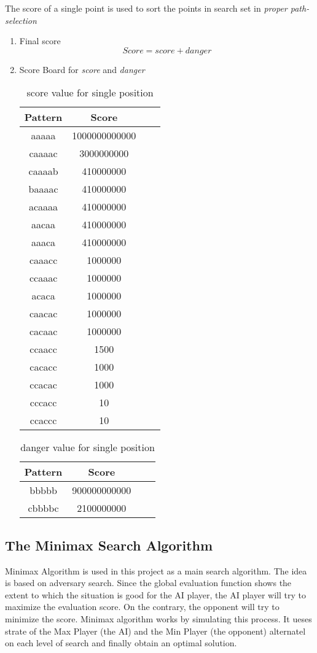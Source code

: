 \documentclass[conference]{IEEEtran}
\begin{document}
The score of a single point is used to sort the points in search set in \emph{proper path-selection}
\begin{enumerate}
	\item Final score
	$$Score = score + danger$$
	\item Score Board for \emph{score} and \emph{danger}
	
	\begin{table}[htb]
	\caption{score value for single position}
	\centering
    \begin{tabular}{cccc}
    \toprule
    Pattern&Score\\
    \midrule
	aaaaa&1000000000000\\
	caaaac&3000000000\\
	caaaab&410000000\\
    baaaac&410000000\\
    acaaaa&410000000\\
    aacaa&410000000\\
    aaaca&410000000\\
    caaacc&1000000\\
    ccaaac&1000000\\
    acaca&1000000\\
    caacac&1000000\\
    cacaac&1000000\\
    ccaacc&1500\\
    cacacc&1000\\
    ccacac&1000\\
    cccacc&10\\
    ccaccc&10\\    
	\bottomrule
	\end{tabular}
	\label{table:1}
	\end{table}
	

	\begin{table}[htb]
	\caption{danger value for single position}
	\centering
    \begin{tabular}{cccc}
    \toprule
    Pattern&Score\\
    \midrule
	bbbbb&900000000000\\
	cbbbbc&2100000000\\
	\bottomrule
	\end{tabular}
	\label{table:1}
	\end{table}
	
\end{enumerate}

\subsection{The Minimax Search Algorithm}
Minimax Algorithm is used in this project as a main search algorithm. The idea is based on adversary search. Since the global evaluation function shows the extent to which the situation is good for the AI player, the AI player will try to maximize the evaluation score. On the contrary, the opponent will try to minimize the score. Minimax algorithm works by simulating this process. It ueses strate of the Max Player (the AI) and the Min Player (the opponent) alternatel on each level of search and finally obtain an optimal solution.
\end{document}
